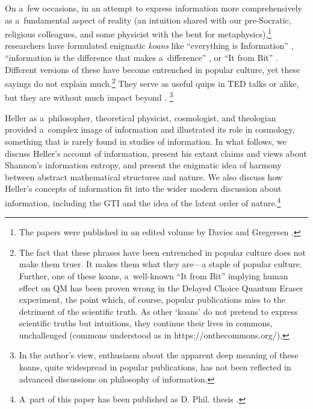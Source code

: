 On a~few occasions, in an attempt to express information more comprehensively as a~fundamental aspect of reality (an intuition shared with our pre-Socratic, religious colleagues, and some physicist with the bent for metaphysics),\footnote{The papers were published in an edited volume by Davies and Gregersen 
\parencite*[][]{}.%
} researchers have formulated enigmatic \textit{koans} like ``everything is Information'' 
\parencite[][]{jones_everything_2018}, %
 ``information is the difference that makes a~difference'' 
\parencite[see][]{sloman_what_2018}, %
 or ``It from Bit'' 
\parencite[][]{wheeler_information_1989}. %
 Different versions of these have become entrenched in popular culture, yet these sayings do not explain much.\footnote{The fact that these phrases have been entrenched in popular culture does not make them truer. It makes them what they are---a staple of popular culture. Further, one of these koans, a~well-known ``It from Bit'' 
\parencite[][]{wheeler_information_1989} %
 implying human effect on QM has been proven wrong in the Delayed Choice Quantum Eraser experiment, the point which, of course, popular publications miss to the detriment of the scientific truth. As other ‘koans' do not pretend to express scientific truths but intuitions, they continue their lives in commons, unchallenged (commons understood as in https://onthecommons.org/).} They serve as useful quips in TED talks or alike, but they are without much impact beyond 
\parencite[see e.g][]{tetlow_phil_2017}.%
\footnote{In the author's view, enthusiasm about the apparent deep meaning of these koans, quite widespread in popular publications, has not been reflected in advanced discussions on philosophy of information.}



Heller as a~philosopher, theoretical physicist, cosmologist, and theologian provided a~complex image of information and illustrated its role in cosmology, something that is rarely found in studies of information. In what follows, we discuss Heller's account of information, present his extant claims and views about Shannon's information entropy, and present the enigmatic idea of harmony between abstract mathematical structures and nature. We also discuss how Heller's concepts of information fit into the wider modern discussion about information, including the GTI and the idea of the latent order of nature.\footnote{A~part of this paper has been published as D. Phil. thesis 
\parencite[][]{krzanowski_ontological_2022}.%
}



